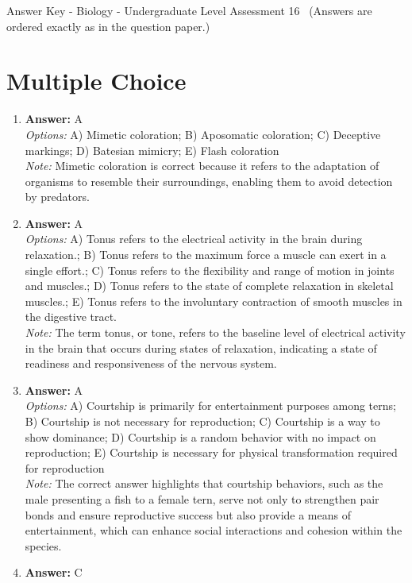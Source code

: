 \documentclass[12pt]{article}
\begin{document}
\begin{center}
Answer Key - Biology - Undergraduate Level Assessment 16 \
\small (Answers are ordered exactly as in the question paper.)
\end{center}

\section*{Multiple Choice}
\begin{enumerate}[label=\arabic*.]
\item \textbf{Answer:} A
\\ \textit{Options:} A) Mimetic coloration; B) Aposomatic coloration; C) Deceptive markings; D) Batesian mimicry; E) Flash coloration
\\ \textit{Note:} Mimetic coloration is correct because it refers to the adaptation of organisms to resemble their surroundings, enabling them to avoid detection by predators.
\item \textbf{Answer:} A
\\ \textit{Options:} A) Tonus refers to the electrical activity in the brain during relaxation.; B) Tonus refers to the maximum force a muscle can exert in a single effort.; C) Tonus refers to the flexibility and range of motion in joints and muscles.; D) Tonus refers to the state of complete relaxation in skeletal muscles.; E) Tonus refers to the involuntary contraction of smooth muscles in the digestive tract.
\\ \textit{Note:} The term tonus, or tone, refers to the baseline level of electrical activity in the brain that occurs during states of relaxation, indicating a state of readiness and responsiveness of the nervous system.
\item \textbf{Answer:} A
\\ \textit{Options:} A) Courtship is primarily for entertainment purposes among terns; B) Courtship is not necessary for reproduction; C) Courtship is a way to show dominance; D) Courtship is a random behavior with no impact on reproduction; E) Courtship is necessary for physical transformation required for reproduction
\\ \textit{Note:} The correct answer highlights that courtship behaviors, such as the male presenting a fish to a female tern, serve not only to strengthen pair bonds and ensure reproductive success but also provide a means of entertainment, which can enhance social interactions and cohesion within the species.
\item \textbf{Answer:} C

\end{enumerate}
\end{document}
